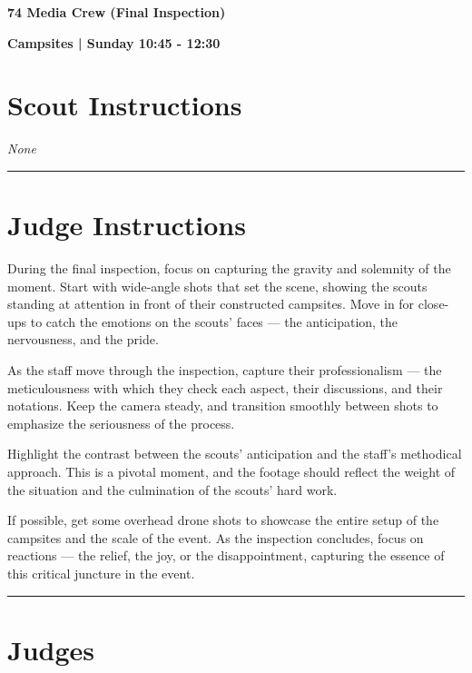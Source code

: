 \documentclass[10pt]{article}
\newcommand{\newtitle}[1]{\begin{center}{\Huge\bfseries #1 }\\ \vspace{5mm}\end{center}}
\newcommand{\newsubtitle}[1]{\begin{center}{\color{grey}\Large\bfseries #1 }\\ \vspace{5mm}\end{center}}
\begin{document}
	\vspace{1cm}


	\clearpage
		\newtitle{74 Media Crew (Final Inspection) }
	\newsubtitle{Campsites | Sunday 10:45 - 12:30}
		\setcounter{section}{73}
	\section*{Scout Instructions}
		\textit{None}
	
	\vspace{0.5cm}
	\hrule
	\vspace{0.5cm}

		\section*{Judge Instructions}
		During the final inspection, focus on capturing the gravity and solemnity of the moment. Start with wide-angle shots that set the scene, showing the scouts standing at attention in front of their constructed campsites. Move in for close-ups to catch the emotions on the scouts' faces — the anticipation, the nervousness, and the pride. 



As the staff move through the inspection, capture their professionalism — the meticulousness with which they check each aspect, their discussions, and their notations. Keep the camera steady, and transition smoothly between shots to emphasize the seriousness of the process.



Highlight the contrast between the scouts' anticipation and the staff's methodical approach. This is a pivotal moment, and the footage should reflect the weight of the situation and the culmination of the scouts' hard work.



If possible, get some overhead drone shots to showcase the entire setup of the campsites and the scale of the event. As the inspection concludes, focus on reactions — the relief, the joy, or the disappointment, capturing the essence of this critical juncture in the event.
\vspace{0.5cm}
	\hrule
	\vspace{0.5cm}
		\section*{\faUsers \: Judges}

		
\end{document}
